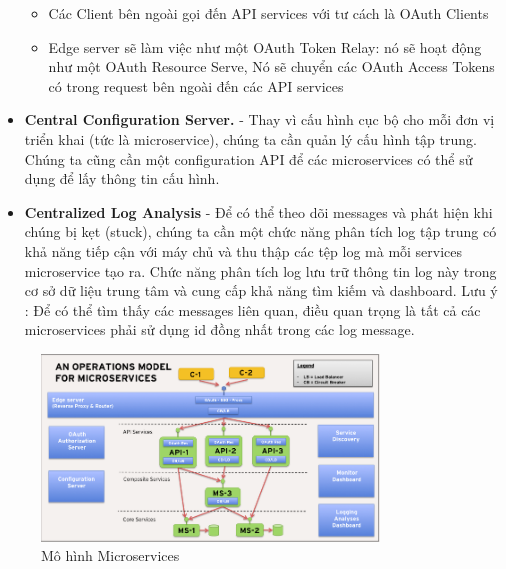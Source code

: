 \begin{itemize}
\begin{itemize}
	            \item Các Client bên ngoài gọi đến API services với tư cách là OAuth Clients
	            \item Edge server sẽ làm việc như một OAuth Token Relay: nó sẽ hoạt động như một OAuth Resource Serve, Nó sẽ chuyển các OAuth Access Tokens có trong request bên ngoài đến các API services
	        \end{itemize}
	        \item \textbf{Central Configuration Server.} - Thay vì cấu hình cục bộ cho mỗi đơn vị triển khai (tức là microservice), chúng ta cần quản lý cấu hình tập trung. Chúng ta cũng cần một configuration API để các microservices có thể sử dụng để lấy thông tin cấu hình.
	        \item \textbf{Centralized Log Analysis} - Để có thể theo dõi messages và phát hiện khi chúng bị kẹt (stuck), chúng ta cần một chức năng phân tích log tập trung có khả năng tiếp cận với máy chủ và thu thập các tệp log mà mỗi services microservice tạo ra. Chức năng phân tích log lưu trữ thông tin log này trong cơ sở dữ liệu trung tâm và cung cấp khả năng tìm kiếm và dashboard. Lưu ý : Để có thể tìm thấy các messages liên quan, điều quan trọng là tất cả các microservices phải sử dụng id đồng nhất trong các log message.
		\end{itemize}
	
		\begin{figure}[H]
			\includegraphics[width=0.8\textwidth]{Images/model-microservice.png}
			\centering
			\linebreak
			\caption{Mô hình Microservices}
		\end{figure}		

